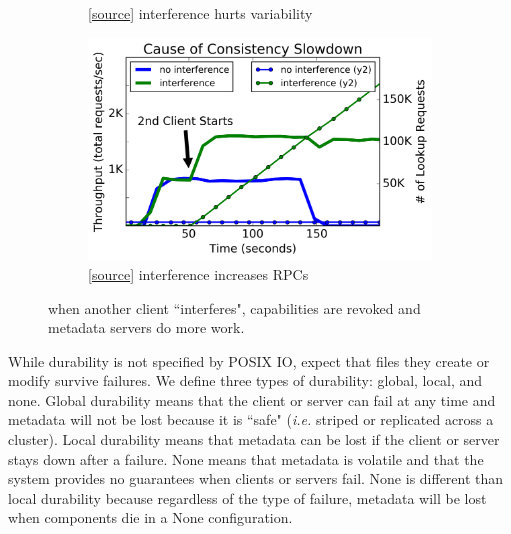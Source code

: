 \begin{figure}[t]
\begin{subfigure}[b]{.32\linewidth}
      \caption{[\href{https://github.com/michaelsevilla/cudele-popper/blob/revision/experiments/baseline-creates/visualize/viz.ipynb}{source}]
      interference hurts variability}
      \label{fig:overhead-b}
  \end{subfigure}
  \begin{subfigure}[b]{.32\linewidth}
      \centering
      \includegraphics[width=1.15\linewidth]{graphs/behavior-interfere.png}
      \caption{[\href{https://github.com/michaelsevilla/cudele-popper/blob/revision/experiments/baseline-interfere/visualize/viz.ipynb}{source}]
      interference increases RPCs}
      \label{fig:overhead-c}
  \end{subfigure}
  \caption{ when another client ``interferes", capabilities are revoked and
metadata servers do more work.} \label{fig:overhead}
\end{figure}

While durability is not specified by POSIX IO,
 expect that files they create or
modify survive failures.  We define three types of durability: global, local,
and none.  Global durability means that the client or server can fail at any
time and metadata will not be lost because it is ``safe" ({\it i.e.} striped or
replicated across a cluster). Local durability means that metadata can be lost
if the client or server stays down after a failure. None means that metadata is
volatile and that the system provides no guarantees when clients or servers
fail.  None is different than local durability because regardless of the type
of failure, metadata will be lost when components die in a None configuration.

